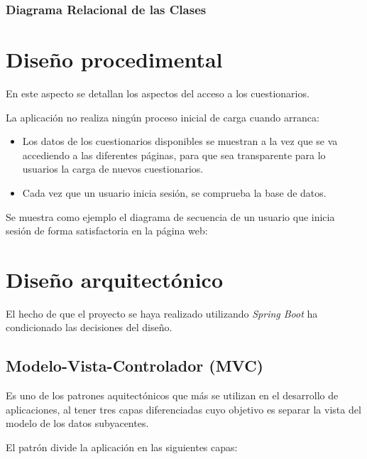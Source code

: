 \subsubsection{Diagrama Relacional de las Clases}

\section{Diseño procedimental}
En este aspecto se detallan los aspectos del acceso a los cuestionarios.

La aplicación no realiza ningún proceso inicial de carga cuando arranca:

\begin{itemize}
	\item Los datos de los cuestionarios disponibles se muestran a la vez que se va accediendo a las diferentes páginas, para que sea transparente para lo usuarios la carga de nuevos cuestionarios.
	\item Cada vez que un usuario inicia sesión, se comprueba la base de datos.
\end{itemize}

Se muestra como ejemplo el diagrama de secuencia de un usuario que inicia sesión de forma satisfactoria en la página web:

\section{Diseño arquitectónico}

El hecho de que el proyecto se haya realizado utilizando \textit{Spring Boot} ha condicionado las decisiones del diseño.

\subsection{Modelo-Vista-Controlador (MVC)}

Es uno de los patrones aquitectónicos \cite{web:mvc} que más se utilizan en el desarrollo de aplicaciones, al tener tres capas diferenciadas cuyo objetivo es separar la vista del modelo de los datos subyacentes.

El patrón divide la aplicación en las siguientes capas:

